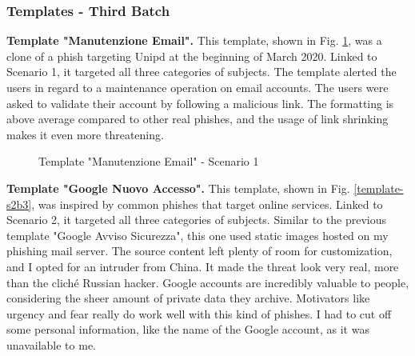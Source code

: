 \documentclass[a4paper]{article}
\begin{document}
\subsubsection{Templates - Third Batch}

\noindent
\textbf{Template "Manutenzione Email".} This template, shown in Fig. \ref{template-s1b3}, was a clone of a phish targeting Unipd at the beginning of March 2020. Linked to Scenario 1, it targeted all three categories of subjects. The template alerted the users in regard to a maintenance operation on email accounts. The users were asked to validate their account by following a malicious link. The formatting is above average compared to other real phishes, and the usage of link shrinking makes it even more threatening.

\bigskip

\begin{figure}[H]
	\centering
	\caption{Template "Manutenzione Email" - Scenario 1}
	\label{template-s1b3}
\end{figure}

\newpage

\noindent
\textbf{Template "Google Nuovo Accesso".} This template, shown in Fig. \ref{template-s2b3}, was inspired by common phishes that target online services. Linked to Scenario 2, it targeted all three categories of subjects. Similar to the previous template "Google Avviso Sicurezza", this one used static images hosted on my phishing mail server. The source content left plenty of room for customization, and I opted for an intruder from China. It made the threat look very real, more than the cliché Russian hacker. Google accounts are incredibly valuable to people, considering the sheer amount of private data they archive. Motivators like urgency and fear really do work well with this kind of phishes. I had to cut off some personal information, like the name of the Google account, as it was unavailable to me.
\end{document}
